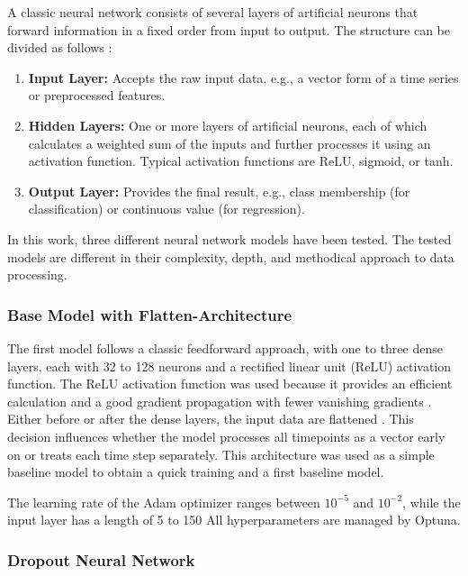A classic neural network consists of several layers of artificial neurons that forward information in a fixed order from input to output.
The structure can be divided as follows \cite{nn-basics}:

\begin{enumerate}
    \item \textbf{Input Layer:} Accepts the raw input data, e.g., a vector form of a time series or preprocessed features.
    \item \textbf{Hidden Layers:} One or more layers of artificial neurons, each of which calculates a weighted sum of the inputs and further processes it using an activation function.
    Typical activation functions are ReLU, sigmoid, or tanh.
    \item \textbf{Output Layer:} Provides the final result, e.g., class membership (for classification) or continuous value (for regression).
\end{enumerate}

In this work, three different neural network models have been tested.
The tested models are different in their complexity, depth, and methodical approach to data processing.

\subsubsection{Base Model with Flatten-Architecture}

The first model follows a classic feedforward approach, with one to three dense layers, each with 32 to 128 neurons and a rectified linear unit (ReLU) activation function.
The ReLU activation function was used because it provides an efficient calculation and a good gradient propagation with fewer vanishing gradients \cite{springer-ml-basics}.
Either before or after the dense layers, the input data are flattened \cite{keras-flatten}.
This decision influences whether the model processes all timepoints as a vector early on or treats each time step separately.
This architecture was used as a simple baseline model to obtain a quick training and a first baseline model.

The learning rate of the Adam optimizer ranges between $10^{-5}$ and $10^{-2}$, while the input layer has a length of 5 to 150
All hyperparameters are managed by Optuna.



\subsubsection{Dropout Neural Network}

